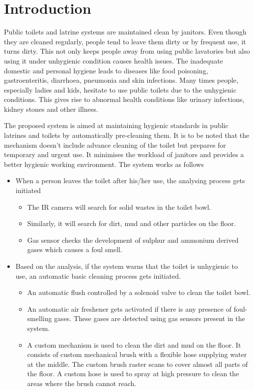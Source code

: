 \documentclass[conference]{IEEEtran}
\begin{document}
\section{Introduction}
Public toilets and latrine systems are maintained clean by janitors. Even though they are cleaned regularly, people tend to leave them dirty or by frequent use, it turns dirty. This not only keeps people away from using public lavatories but also using it under unhygienic condition causes health issues.  The inadequate domestic and personal hygiene leads to diseases like food poisoning, gastroenteritis, diarrhoea, pneumonia and skin infections.  Many times people, especially ladies and kids, hesitate to use public toilets due to the unhygienic conditions. This gives rise to abnormal health conditions like urinary infections, kidney stones and other illness.

The proposed system is aimed at maintaining hygienic standards in public latrines and toilets by automatically pre-cleaning them. It is to be noted that the mechanism doesn't include advance cleaning of the toilet but prepares for temporary and urgent use. It minimises the workload of janitors and provides a better hygienic working environment. The system works as follows
\begin{itemize}

\item When a person leaves the toilet after his/her use, the analysing process gets initiated
    \begin{itemize}
 
      \item The IR camera will search for solid wastes in the toilet bowl.
      \item Similarly, it will search for dirt, mud and other particles on the floor.
      \item Gas sensor checks the development of sulphur and ammonium derived gases which causes a foul smell.
    \end{itemize}{}
\item Based on the analysis, if the system warns that the toilet is unhygienic to use, an automatic basic cleaning process gets initiated.
    \begin{itemize}
    \item An automatic flush controlled by a solenoid valve to clean the toilet bowl.
    \item An automatic air freshener gets activated if there is any presence of foul-smelling gases. These gases are detected using gas sensors present in the system.
    \item A custom mechanism is used to clean the dirt and mud on the floor. It consists of custom mechanical brush with a flexible hose supplying water at the middle. The custom brush raster scans to cover almost all parts of the floor. A custom hose is used to spray at high pressure to clean the areas where the brush cannot reach.
    \end{itemize}{}
\end{itemize}
\end{document}

